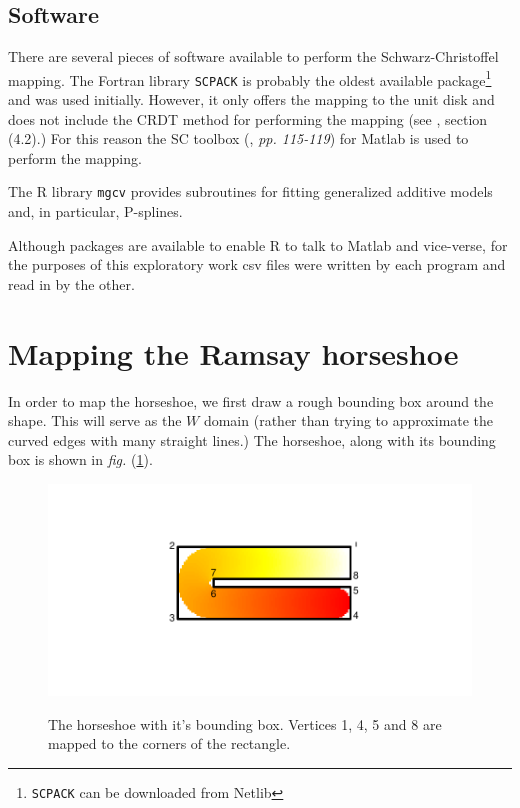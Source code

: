 \documentclass[a4paper,10pt]{amsart}
\newcommand{\sch}{Schwarz-Christoffel }
\newcommand{\fig}[1]{\emph{fig.} (\ref{#1})}
\begin{document}
\subsection{Software}

There are several pieces of software available to perform the \sch mapping. The Fortran library \texttt{SCPACK} is probably the oldest available package\footnote{\texttt{SCPACK} can be downloaded from Netlib} and was used initially. However, it only offers the mapping to the unit disk and does not include the CRDT method for performing the mapping (see \cite{miller08}, section (4.2).) For this reason the SC toolbox (\cite{driscoll}, \emph{pp. 115-119}) for Matlab is used to perform the mapping. 

The \textsf{R} library \texttt{mgcv} provides subroutines for fitting generalized additive models and, in particular, P-splines.

Although packages are available to enable \textsf{R} to talk to Matlab and vice-verse, for the purposes of this exploratory work csv files were written by each program and read in by the other.

\section{Mapping the Ramsay horseshoe}

In order to map the horseshoe, we first draw a rough bounding box around the shape. This will serve as the $W$ domain (rather than trying to approximate the curved edges with many straight lines.) The horseshoe, along with its bounding box is shown in \fig{hswithboundingbox}.

\begin{figure}
\centering
\includegraphics[trim=0.5in 1in 0in 1in]{figs/hswithboundingbox.pdf} \\
\caption{The horseshoe with it's bounding box. Vertices 1, 4, 5 and 8 are mapped to the corners of the rectangle.}
\label{hswithboundingbox}
\end{figure}
\end{document}
